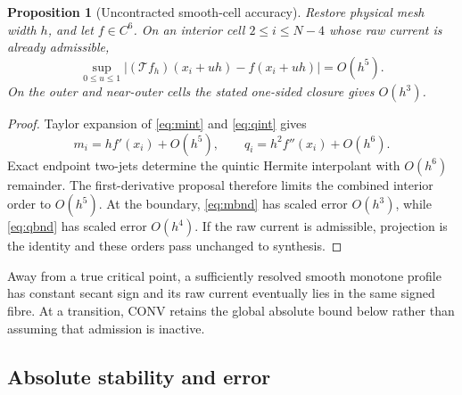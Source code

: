 \documentclass[journal]{IEEEtran}
\newtheorem{proposition}{Proposition}
\newcommand{\Tcal}{\mathcal{T}}
\begin{document}
\begin{proposition}[Uncontracted smooth-cell accuracy]
Restore physical mesh width \(h\), and let \(f\in C^6\). On an interior
cell \(2\leq i\leq N-4\) whose raw current is already admissible,
\begin{equation}
 \sup_{0\leq u\leq1}
 |(\Tcal f_h)(x_i+uh)-f(x_i+uh)|=O(h^5).
 \label{eq:orderinterior}
\end{equation}
On the outer and near-outer cells the stated one-sided closure gives
\(O(h^3)\).
\end{proposition}

\begin{proof}
Taylor expansion of \eqref{eq:mint} and \eqref{eq:qint} gives
\[
 m_i=hf'(x_i)+O(h^5),\qquad
 q_i=h^2f''(x_i)+O(h^6).
\]
Exact endpoint two-jets determine the quintic Hermite interpolant with
\(O(h^6)\) remainder. The first-derivative proposal therefore limits the
combined interior order to \(O(h^5)\). At the boundary,
\eqref{eq:mbnd} has scaled error \(O(h^3)\), while
\eqref{eq:qbnd} has scaled error \(O(h^4)\). If the raw current is
admissible, projection is the identity and these orders pass unchanged to
synthesis.
\end{proof}

Away from a true critical point, a sufficiently resolved smooth monotone
profile has constant secant sign and its raw current eventually lies in the
same signed fibre. At a transition, CONV retains the global absolute bound
below rather than assuming that admission is inactive.

\subsection{Absolute stability and error}
\end{document}
